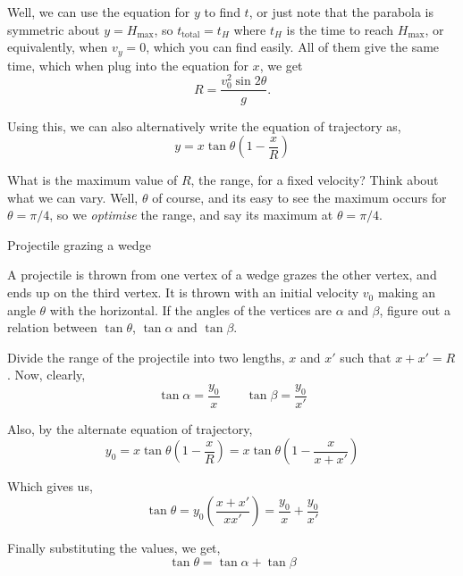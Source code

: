     Well, we can use the equation for $y$ to
    find $t$, or just note that the parabola is symmetric about $y = H_{\text{max}}$, so $t_{\text{total}} = t_H$ where $t_H$ is the time to reach $H_{\text{max}}$, or 
    equivalently, when $v_y = 0$, which you can find easily. All of them give the same time, which when plug into the equation for $x$, we get
    \begin{equation}
        \boxed{R = \frac{v_0^2\sin2\theta}{g}}.    
    \end{equation}

    Using this, we can also alternatively write the equation of trajectory as,
    \begin{equation}
        y = x\tan\theta\left(1 - \frac{x}{R}\right)
    \end{equation}

    What is the maximum value of $R$, the range, for a fixed velocity? Think about what we can vary. Well, $\theta$ of course, and its easy to see the maximum occurs for $\theta = \pi/4$,
    so we \textit{optimise} the range, and say its maximum at $\theta = \pi/4$. 

    \begin{marginfigure}
        \vspace{10em}
        \hspace*{-4em}
        \caption{Projectile grazing a wedge}
    \end{marginfigure}

    \begin{example}
        A projectile is thrown from one vertex of a wedge grazes the other vertex, and ends up on the third vertex. 
        It is thrown with an initial velocity $v_0$ making an angle $\theta$ with the horizontal. 
        If the angles of the vertices are $\alpha$ and $\beta$, figure out a relation 
        between $\tan \theta$, $\tan \alpha$ and $\tan \beta$.

        \begin{soln}
            Divide the range of the projectile into two lengths, $x$ and $x'$ such that $x + x' = R$. Now, clearly,
            \[
            \tan \alpha = \frac{y_0}{x} \qquad \tan \beta = \frac{y_0}{x'}
            \]
            
            Also, by the alternate equation of trajectory,
            \[
            y_0 = x \tan \theta \left(1 - \frac{x}{R} \right) = x \tan \theta \left(1 - \frac{x}{x + x'} \right)
            \]
            
            Which gives us,
            \[
            \tan \theta = y_0 \left( \frac{x + x'}{x x'} \right) = \frac{y_0}{x} + \frac{y_0}{x'}
            \]
            
            Finally substituting the values, we get,
            \[
            \tan \theta = \tan \alpha + \tan \beta
            \]
        \end{soln}

    \end{example}
    
